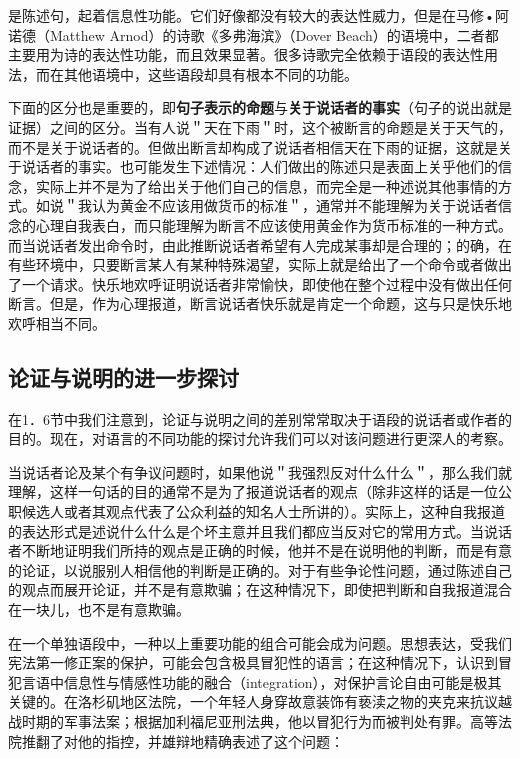 是陈述句，起着信息性功能。它们好像都没有较大的表达性威力，但是在马修•阿诺德（Matthew Arnod）的诗歌《多弗海滨》（Dover Beach）的语境中，二者都主要用为诗的表达性功能，而且效果显著。很多诗歌完全依赖于语段的表达性用法，而在其他语境中，这些语段却具有根本不同的功能。

下面的区分也是重要的，即\textbf{句子表示的命题}与\textbf{关于说话者的事实}（句子的说出就是证据）之间的区分。当有人说＂天在下雨＂时，这个被断言的命题是关于天气的，而不是关于说话者的。但做出断言却构成了说话者相信天在下雨的证据，这就是关于说话者的事实。也可能发生下述情况：人们做出的陈述只是表面上关乎他们的信念，实际上并不是为了给出关于他们自己的信息，而完全是一种述说其他事情的方式。如说＂我认为黄金不应该用做货币的标准＂，通常并不能理解为关于说话者信念的心理自我表白，而只能理解为断言不应该使用黄金作为货币标准的一种方式。而当说话者发出命令时，由此推断说话者希望有人完成某事却是合理的；的确，在有些环境中，只要断言某人有某种特殊渴望，实际上就是给出了一个命令或者做出了一个请求。快乐地欢呼证明说话者非常愉快，即使他在整个过程中没有做出任何断言。但是，作为心理报道，断言说话者快乐就是肯定一个命题，这与只是快乐地欢呼相当不同。

\subsection{论证与说明的进一步探讨}

在1．6节中我们注意到，论证与说明之间的差别常常取决于语段的说话者或作者的目的。现在，对语言的不同功能的探讨允许我们可以对该问题进行更深人的考察。

当说话者论及某个有争议问题时，如果他说＂我强烈反对什么什么＂，那么我们就理解，这样一句话的目的通常不是为了报道说话者的观点（除非这样的话是一位公职候选人或者其观点代表了公众利益的知名人士所讲的）。实际上，这种自我报道的表达形式是述说什么什么是个坏主意并且我们都应当反对它的常用方式。当说话者不断地证明我们所持的观点是正确的时候，他并不是在说明他的判断，而是有意的论证，以说服别人相信他的判断是正确的。对于有些争论性问题，通过陈述自己的观点而展开论证，并不是有意欺骗；在这种情况下，即使把判断和自我报道混合在一块儿，也不是有意欺骗。

在一个单独语段中，一种以上重要功能的组合可能会成为问题。思想表达，受我们宪法第一修正案的保护，可能会包含极具冒犯性的语言；在这种情况下，认识到冒犯言语中信息性与情感性功能的融合（integration），对保护言论自由可能是极其关键的。在洛杉矶地区法院，一个年轻人身穿故意装饰有亵渎之物的夹克来抗议越战时期的军事法案；根据加利福尼亚刑法典，他以冒犯行为而被判处有罪。高等法院推翻了对他的指控，并雄辩地精确表述了这个问题：

